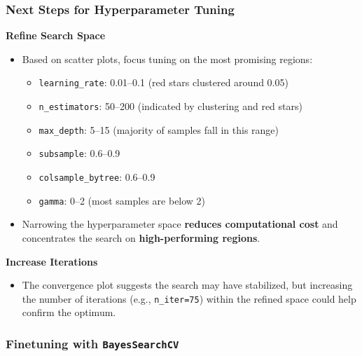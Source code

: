 \documentclass[
  letterpaper,
  DIV=11,
  numbers=noendperiod]{scrreprt}
\providecommand{\tightlist}{%
  \setlength{\itemsep}{0pt}\setlength{\parskip}{0pt}}\usepackage{longtable,booktabs,array}
\begin{document}
\subsubsection{Next Steps for Hyperparameter
Tuning}\label{next-steps-for-hyperparameter-tuning}

\textbf{Refine Search Space}

\begin{itemize}
\tightlist
\item
  Based on scatter plots, focus tuning on the most promising regions:

  \begin{itemize}
  \tightlist
  \item
    \texttt{learning\_rate}: 0.01--0.1 (red stars clustered around 0.05)
  \item
    \texttt{n\_estimators}: 50--200 (indicated by clustering and red
    stars)
  \item
    \texttt{max\_depth}: 5--15 (majority of samples fall in this range)
  \item
    \texttt{subsample}: 0.6--0.9
  \item
    \texttt{colsample\_bytree}: 0.6--0.9
  \item
    \texttt{gamma}: 0--2 (most samples are below 2)
  \end{itemize}
\item
  Narrowing the hyperparameter space \textbf{reduces computational cost}
  and concentrates the search on \textbf{high-performing regions}.
\end{itemize}

\textbf{Increase Iterations}

\begin{itemize}
\tightlist
\item
  The convergence plot suggests the search may have stabilized, but
  increasing the number of iterations (e.g., \texttt{n\_iter=75}) within
  the refined space could help confirm the optimum.
\end{itemize}

\subsubsection{\texorpdfstring{Finetuning with
\texttt{BayesSearchCV}}{Finetuning with BayesSearchCV}}\label{finetuning-with-bayessearchcv}
\end{document}
